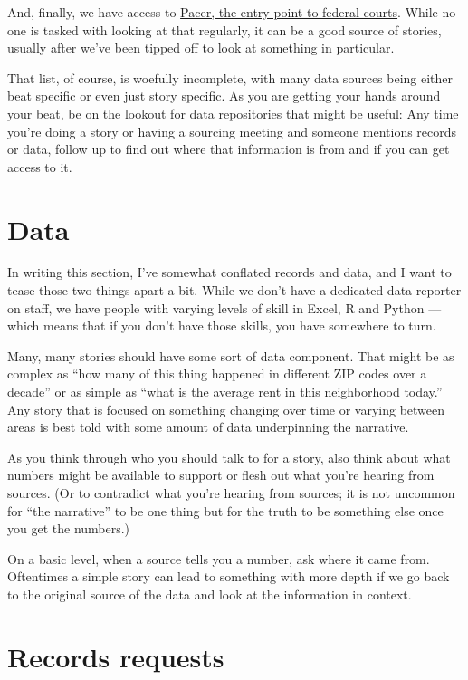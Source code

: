 \documentclass[
  11pt,
  american,
  letterpaperpaper,
  extrafontsizes,onecolumn,openright
  ]{memoir}
\begin{document}
And, finally, we have access to \href{https://pcl.uscourts.gov/pcl/index.jsf}{Pacer, the entry point to federal courts}. While no one is tasked with looking at that regularly, it can be a good source of stories, usually after we've been tipped off to look at something in particular.

That list, of course, is woefully incomplete, with many data sources being either beat specific or even just story specific. As you are getting your hands around your beat, be on the lookout for data repositories that might be useful: Any time you're doing a story or having a sourcing meeting and someone mentions records or data, follow up to find out where that information is from and if you can get access to it.

\hypertarget{data}{%
\section*{Data}\label{data}}

In writing this section, I've somewhat conflated records and data, and I want to tease those two things apart a bit. While we don't have a dedicated data reporter on staff, we have people with varying levels of skill in Excel, R and Python --- which means that if you don't have those skills, you have somewhere to turn.

Many, many stories should have some sort of data component. That might be as complex as \enquote{how many of this thing happened in different ZIP codes over a decade} or as simple as \enquote{what is the average rent in this neighborhood today.} Any story that is focused on something changing over time or varying between areas is best told with some amount of data underpinning the narrative.

As you think through who you should talk to for a story, also think about what numbers might be available to support or flesh out what you're hearing from sources. (Or to contradict what you're hearing from sources; it is not uncommon for \enquote{the narrative} to be one thing but for the truth to be something else once you get the numbers.)

On a basic level, when a source tells you a number, ask where it came from. Oftentimes a simple story can lead to something with more depth if we go back to the original source of the data and look at the information in context.

\hypertarget{records-requests}{%
\section*{Records requests}\label{records-requests}}
\end{document}
